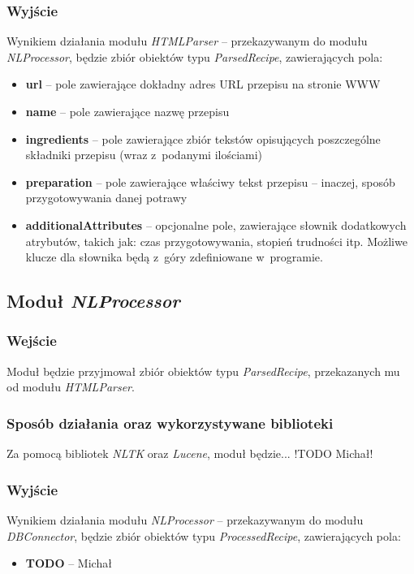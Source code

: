 \documentclass[11pt,a4paper]{article}
\begin{document}
\subsubsection{Wyjście}
Wynikiem działania modułu \textit{HTMLParser} -- przekazywanym do modułu \textit{NLProcessor}, będzie zbiór obiektów typu \textit{ParsedRecipe}, zawierających pola:
\begin{itemize}
  \item \textbf{url} -- pole zawierające dokładny adres URL przepisu na stronie WWW
  \item \textbf{name} -- pole zawierające nazwę przepisu
  \item \textbf{ingredients} -- pole zawierające zbiór tekstów opisujących poszczególne składniki przepisu (wraz z~podanymi ilościami)
  \item \textbf{preparation} -- pole zawierające właściwy tekst przepisu -- inaczej, sposób przygotowywania danej potrawy
  \item \textbf{additionalAttributes} -- opcjonalne pole, zawierające słownik dodatkowych atrybutów, takich jak: czas przygotowywania, stopień trudności itp. Możliwe klucze dla słownika będą z~góry zdefiniowane w~programie.
\end{itemize}

\newpage
\subsection{Moduł \textit{NLProcessor}}
\subsubsection{Wejście}
Moduł będzie przyjmował zbiór obiektów typu \textit{ParsedRecipe}, przekazanych mu od modułu \textit{HTMLParser}.
\subsubsection{Sposób działania oraz wykorzystywane biblioteki}
Za pomocą bibliotek \textit{NLTK} oraz \textit{Lucene}, moduł będzie... !TODO Michał!
\subsubsection{Wyjście}
Wynikiem działania modułu \textit{NLProcessor} -- przekazywanym do modułu \textit{DBConnector}, będzie zbiór obiektów typu \textit{ProcessedRecipe}, zawierających pola:
\begin{itemize}
  \item \textbf{TODO} -- Michał
\end{itemize}
\end{document}
